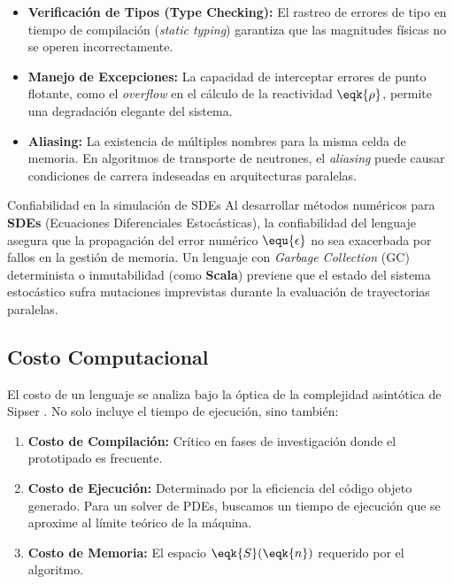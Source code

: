 \begin{itemize}
    \item \textbf{Verificación de Tipos (Type Checking):} El rastreo de errores de tipo en tiempo de compilación (\textit{static typing}) garantiza que las magnitudes físicas no se operen incorrectamente.
    \item \textbf{Manejo de Excepciones:} La capacidad de interceptar errores de punto flotante, como el \textit{overflow} en el cálculo de la reactividad $\eqk{\rho}$, permite una degradación elegante del sistema.
    \item \textbf{Aliasing:} La existencia de múltiples nombres para la misma celda de memoria. En algoritmos de transporte de neutrones, el \textit{aliasing} puede causar condiciones de carrera indeseadas en arquitecturas paralelas.
\end{itemize}

\begin{fisicaconexion}{Confiabilidad en la simulación de SDEs}
Al desarrollar métodos numéricos para \textbf{SDEs} (Ecuaciones Diferenciales Estocásticas), la confiabilidad del lenguaje asegura que la propagación del error numérico $\equ{\epsilon}$ no sea exacerbada por fallos en la gestión de memoria. Un lenguaje con \textit{Garbage Collection} (GC) determinista o inmutabilidad (como \textbf{Scala}) previene que el estado del sistema estocástico sufra mutaciones imprevistas durante la evaluación de trayectorias paralelas.
\end{fisicaconexion}

\subsection{Costo Computacional}

El costo de un lenguaje se analiza bajo la óptica de la complejidad asintótica de Sipser \cite{sipser2012introduction}. No solo incluye el tiempo de ejecución, sino también:

\begin{enumerate}
    \item \textbf{Costo de Compilación:} Crítico en fases de investigación donde el prototipado es frecuente.
    \item \textbf{Costo de Ejecución:} Determinado por la eficiencia del código objeto generado. Para un solver de PDEs, buscamos un tiempo de ejecución que se aproxime al límite teórico de la máquina.
    \item \textbf{Costo de Memoria:} El espacio $\eqk{S}(\eqk{n})$ requerido por el algoritmo.
\end{enumerate}

